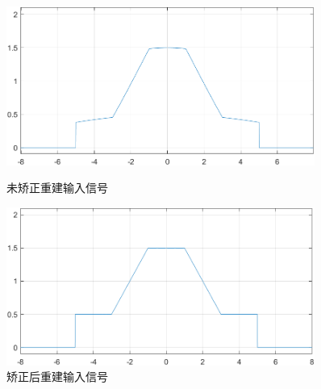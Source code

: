 \documentclass{../source/Experiment}
\begin{document}
\begin{figure}[H]
                \begin{minipage}[t]{0.48\textwidth}
                    \centering
                    \includegraphics[width=0.9\textwidth]{pic/未矫正重建输入信号.png}
                    \caption{未矫正重建输入信号}
                \end{minipage}
                \begin{minipage}[t]{0.48\textwidth}
                    \centering
                    \includegraphics[width=0.9\textwidth]{pic/矫正后重建输入信号.png}
                    \caption{矫正后重建输入信号}
                \end{minipage}
            \end{figure}
\end{document}
